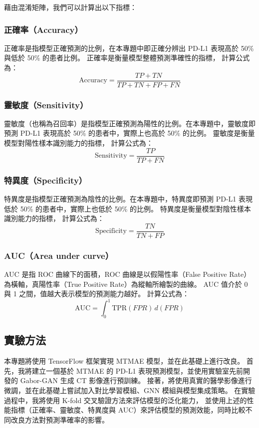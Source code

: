 \documentclass[12pt,a4paper]{article}
\begin{document}
藉由混淆矩陣，我們可以計算出以下指標：

\subsubsection{正確率（Accuracy）}
正確率是指模型正確預測的比例，在本專題中即正確分辨出 PD-L1 表現高於 50\% 與低於 50\% 的患者比例。
正確率是衡量模型整體預測準確性的指標，
計算公式為：
\begin{equation}
\text{Accuracy} = \frac{TP + TN}{TP + TN + FP + FN}
\end{equation}

\subsubsection{靈敏度（Sensitivity）}
靈敏度（也稱為召回率）是指模型正確預測為陽性的比例。在本專題中，靈敏度即預測 PD-L1 表現高於 50\% 的患者中，實際上也高於 50\% 的比例。
靈敏度是衡量模型對陽性樣本識別能力的指標，
計算公式為：
\begin{equation}
\text{Sensitivity} = \frac{TP}{TP + FN}
\end{equation}

\subsubsection{特異度（Specificity）}
特異度是指模型正確預測為陰性的比例。在本專題中，特異度即預測 PD-L1 表現低於 50\% 的患者中，實際上也低於 50\% 的比例。
特異度是衡量模型對陰性樣本識別能力的指標，
計算公式為：
\begin{equation}
\text{Specificity} = \frac{TN}{TN + FP}
\end{equation}
\subsubsection{AUC（Area under curve）}
AUC 是指 ROC 曲線下的面積，ROC 曲線是以假陽性率（False Positive Rate）為橫軸，真陽性率（True Positive Rate）為縱軸所繪製的曲線。
AUC 值介於 0 與 1 之間，值越大表示模型的預測能力越好。
計算公式為：
\begin{equation}
\text{AUC} = \int_{0}^{1} \text{TPR}(FPR) \, d(FPR)
\end{equation}

\subsection{實驗方法}
本專題將使用 TensorFlow 框架實現 MTMAE 模型，並在此基礎上進行改良。
首先，我將建立一個基於 MTMAE 的 PD-L1 表現預測模型，並使用實驗室先前開發的 Gabor-GAN 生成 CT 影像進行預訓練。
接著，將使用真實的醫學影像進行微調，並在此基礎上嘗試加入對比學習模組、GNN 模組與模型集成策略。
在實驗過程中，我將使用 K-fold 交叉驗證方法來評估模型的泛化能力，
並使用上述的性能指標（正確率、靈敏度、特異度與 AUC）來評估模型的預測效能，同時比較不同改良方法對預測準確率的影響。
\end{document}
